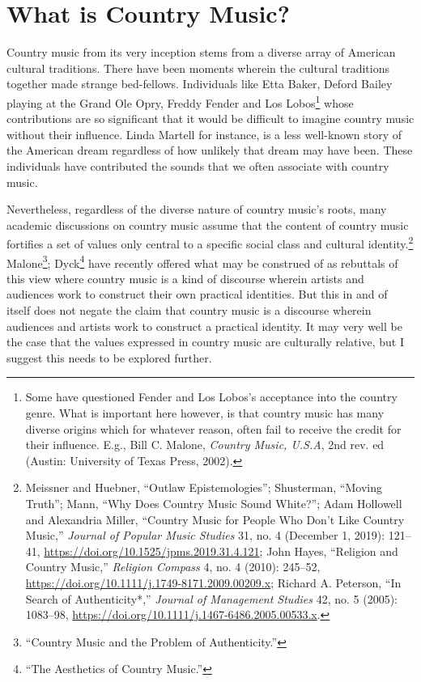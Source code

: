\documentclass[
  12pt,
]{book}
\theoremstyle{definition}
\theoremstyle{definition}
\theoremstyle{definition}
\theoremstyle{definition}
\theoremstyle{remark}
\begin{document}
\section{What is Country Music?}\label{what-is-country-music}

Country music from its very inception stems from a diverse array of American cultural traditions. There have been moments wherein the cultural traditions together made strange bed-fellows. Individuals like Etta Baker, Deford Bailey playing at the Grand Ole Opry, Freddy Fender and Los Lobos\footnote{Some have questioned Fender and Los Lobos's acceptance into the country genre. What is important here however, is that country music has many diverse origins which for whatever reason, often fail to receive the credit for their influence. E.g., Bill C. Malone, \emph{Country Music, {U}.{S}.{A}}, 2nd rev. ed (Austin: University of Texas Press, 2002).} whose contributions are so significant that it would be difficult to imagine country music without their influence. Linda Martell for instance, is a less well-known story of the American dream regardless of how unlikely that dream may have been. These individuals have contributed the sounds that we often associate with country music.

Nevertheless, regardless of the diverse nature of country music's roots, many academic discussions on country music assume that the content of country music fortifies a set of values only central to a specific social class and cultural identity.\footnote{Meissner and Huebner, {``Outlaw Epistemologies''}; Shusterman, {``Moving {Truth}''}; Mann, {``Why Does Country Music Sound White?''}; Adam Hollowell and Alexandria Miller, {``Country {Music} for {People Who Don}'t {Like Country Music},''} \emph{Journal of Popular Music Studies} 31, no. 4 (December 1, 2019): 121--41, \url{https://doi.org/10.1525/jpms.2019.31.4.121}; John Hayes, {``Religion and {Country Music},''} \emph{Religion Compass} 4, no. 4 (2010): 245--52, \url{https://doi.org/10.1111/j.1749-8171.2009.00209.x}; Richard A. Peterson, {``In {Search} of {Authenticity}*,''} \emph{Journal of Management Studies} 42, no. 5 (2005): 1083--98, \url{https://doi.org/10.1111/j.1467-6486.2005.00533.x}.} Malone\footnote{{``Country {Music} and the {Problem} of {Authenticity}.''}}; Dyck\footnote{{``The Aesthetics of Country Music.''}} have recently offered what may be construed of as rebuttals of this view where country music is a kind of discourse wherein artists and audiences work to construct their own practical identities. But this in and of itself does not negate the claim that country music is a discourse wherein audiences and artists work to construct a practical identity. It may very well be the case that the values expressed in country music are culturally relative, but I suggest this needs to be explored further.
\end{document}
